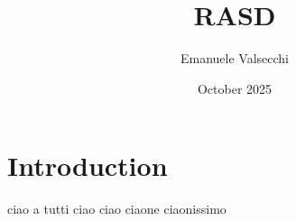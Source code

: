 \documentclass{article}
\title{RASD}
\author{Emanuele Valsecchi}
\date{October 2025}
\begin{document}
\maketitle

\section{Introduction}

ciao a tutti
ciao ciao
ciaone
ciaonissimo
\end{document}
